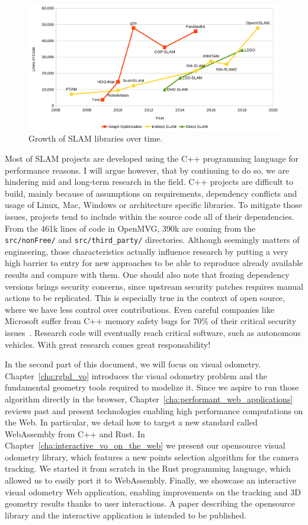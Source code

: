 \begin{figure}[h]
	\centering
	\includegraphics[width=\linewidth]{assets/img/slam-cloc.png}
	\caption{Growth of SLAM libraries over time.}%
	\label{fig:assets/img/slam-cloc}
\end{figure}

Most of SLAM projects are developed using the C++ programming language for performance reasons.
I will argue however, that by continuing to do so, we are hindering mid and long-term research
in the field.
C++ projects are difficult to build, mainly because of assumptions on requirements,
dependency conflicts and usage of Linux, Mac, Windows or architecture specific libraries.
To mitigate those issues, projects tend to include within the source code all of their dependencies.
From the 461k lines of code in OpenMVG, 390k are coming from the \verb|src/nonFree/|
and \verb|src/third_party/| directories.
Although seemingly matters of engineering, those characteristics actually influence research
by putting a very high barrier to entry for new approaches to be able
to reproduce already available results and compare with them.
One should also note that frozing dependency versions brings security concerns,
since upstream security patches requires manual actions to be replicated.
This is especially true in the context of open source,
where we have less control over contributions.
Even careful companies like Microsoft suffer from C++ memory safety bugs
for 70\% of their critical security issues~\cite{msrc-safer}.
Research code will eventually reach critical software, such as autonomous vehicles.
With great research comes great responsability!

In the second part of this document, we will focus on visual odometry.
Chapter~\ref{cha:rgbd_vo} introduces the visual odometry problem
and the fundamental geometry tools required to modelize it.
Since we aspire to run those algorithm directly in the browser,
Chapter~\ref{cha:performant_web_applications} reviews past and present technologies
enabling high performance computations on the Web.
In particular, we detail how to target a new standard called WebAssembly from C++ and Rust.
In Chapter~\ref{cha:interactive_vo_on_the_web} we present our opensource visual odometry library,
which features a new points selection algorithm for the camera tracking.
We started it from scratch in the Rust programming language,
which allowed us to easily port it to WebAssembly.
Finally, we showcase an interactive visual odometry Web application,
enabling improvements on the tracking and 3D geometry results thanks to user interactions.
A paper describing the opensource library and the interactive application is intended to be published.
